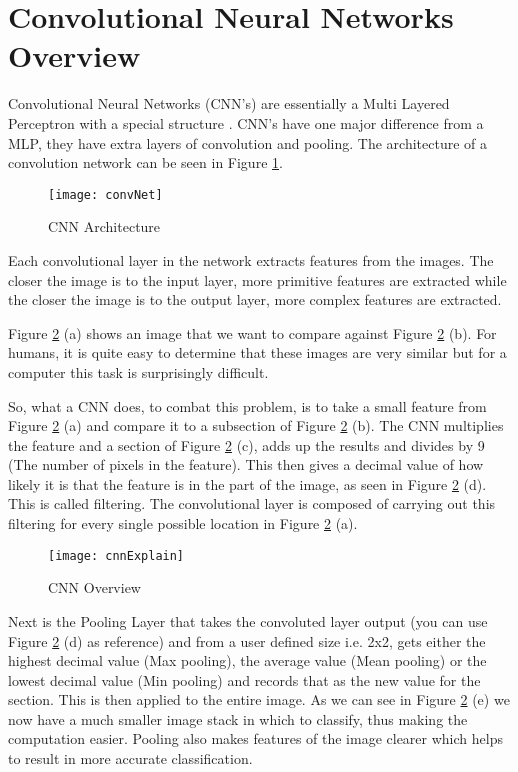 \section{Convolutional Neural Networks Overview}
Convolutional Neural Networks (CNN's) are essentially a Multi Layered Perceptron with a
special structure \parencite{visualizing}. CNN's have one major difference from a MLP, they have extra
layers of convolution and pooling. The architecture of a convolution network can
be seen in Figure \ref{fig:convNet}.

\begin{figure}[h]
	\texttt{[image: convNet]}
	\caption{CNN Architecture}
	\label{fig:convNet}
\end{figure}

Each convolutional layer in the network extracts features from the images.
The closer the image is to the input layer, more primitive features are extracted while
the closer the image is to the output layer, more complex features are extracted.

Figure \ref{fig:cnnExplain} (a) shows an image that we want to compare against
Figure \ref{fig:cnnExplain} (b).
For humans, it is quite easy to determine that these images are very similar but
for a computer this task is surprisingly difficult.

So, what a CNN does, to combat this problem, is to take a small feature from
Figure \ref{fig:cnnExplain} (a) and compare it to a subsection of Figure \ref{fig:cnnExplain} (b).
The CNN multiplies the feature and a section of Figure \ref{fig:cnnExplain} (c), adds
up the results and divides by 9 (The number of pixels in the feature). This then gives a decimal value of how likely
it is that the feature is in the part of the image, as seen in Figure
\ref{fig:cnnExplain} (d).
This is called filtering. The convolutional layer is composed of carrying out
this filtering for every single possible location in Figure \ref{fig:cnnExplain} (a).

\begin{figure}
    \texttt{[image: cnnExplain]}
    \caption{CNN Overview}
    \label{fig:cnnExplain}
\end{figure}
Next is the Pooling Layer that takes the convoluted
layer output (you can use Figure \ref{fig:cnnExplain} (d) as reference) and from a
user defined size i.e. 2x2, gets either the highest decimal value (Max pooling), the average value (Mean pooling) or the lowest decimal value (Min pooling) and records that as the new value for the
section. This is then applied to the entire image. As we can see in Figure
\ref{fig:cnnExplain} (e) we now have a much smaller image stack in which to classify,
thus making the computation easier. Pooling also makes features of the image clearer which helps to result in more accurate classification.

